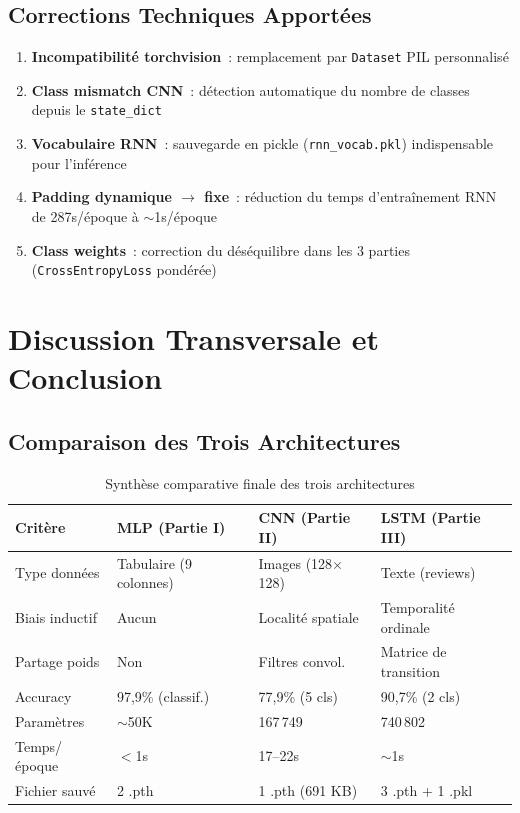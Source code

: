 \documentclass[12pt,a4paper]{report}
\begin{document}
\section{Corrections Techniques Apportées}
\begin{enumerate}[leftmargin=*,nosep]
  \item \textbf{Incompatibilité torchvision}~: remplacement par \texttt{Dataset} PIL personnalisé
  \item \textbf{Class mismatch CNN}~: détection automatique du nombre de classes depuis le \texttt{state\_dict}
  \item \textbf{Vocabulaire RNN}~: sauvegarde en pickle (\texttt{rnn\_vocab.pkl}) indispensable pour l'inférence
  \item \textbf{Padding dynamique $\to$ fixe}~: réduction du temps d'entraînement RNN de 287s/époque à $\sim$1s/époque
  \item \textbf{Class weights}~: correction du déséquilibre dans les 3 parties (\texttt{CrossEntropyLoss} pondérée)
\end{enumerate}

\chapter{Discussion Transversale et Conclusion}

\section{Comparaison des Trois Architectures}

\begin{table}[H]
\centering
\caption{Synthèse comparative finale des trois architectures}
\begin{tabularx}{\textwidth}{lXXX}
\toprule
\textbf{Critère}&\textbf{MLP (Partie I)}&\textbf{CNN (Partie II)}&\textbf{LSTM (Partie III)}\\
\midrule
Type données & Tabulaire (9 colonnes) & Images (128$\times$128) & Texte (reviews) \\
Biais inductif & Aucun & Localité spatiale & Temporalité ordinale \\
Partage poids & Non & Filtres convol. & Matrice de transition \\
Accuracy & 97,9\% (classif.) & 77,9\% (5 cls) & 90,7\% (2 cls) \\
Paramètres & $\sim$50K & 167\,749 & 740\,802 \\
Temps/époque & $<$1s & 17--22s & $\sim$1s \\
Fichier sauvé & 2 .pth & 1 .pth (691 KB) & 3 .pth + 1 .pkl \\
\bottomrule
\end{tabularx}
\end{table}
\end{document}
